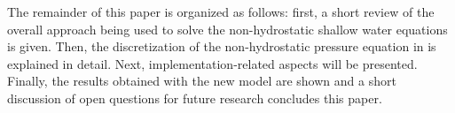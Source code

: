 The remainder of this paper is organized as follows: first, a short review of the overall approach being used to solve the non-hydrostatic shallow water equations is given. Then, the discretization of the non-hydrostatic pressure equation in \samoa is explained in detail. Next, implementation-related aspects will be presented. Finally, the results obtained with the new model are shown and a short discussion of open questions for future research concludes this paper.


